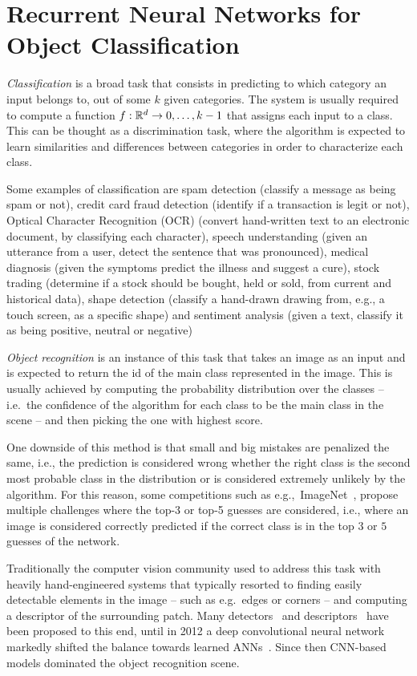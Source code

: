 \chapter{Recurrent Neural Networks for Object Classification}\label{sec:renet}

\emph{Classification} is a broad task that consists in predicting to which
category an input belongs to, out of some $k$ given categories. The system is
usually required to compute a function $f: \mathbb{R}^d \to {0, \dots, k-1}$ that
assigns each input to a class. This can be thought as a discrimination task,
where the algorithm is expected to learn similarities and differences between
categories in order to characterize each class.

Some examples of classification are spam detection (classify a message as being
spam or not), credit card fraud detection (identify if a transaction is legit
or not), Optical Character Recognition (OCR) (convert hand-written text to an
electronic document, by classifying each character), speech understanding
(given an utterance from a user, detect the sentence that was pronounced),
medical diagnosis (given the symptoms predict the illness and suggest a cure),
stock trading (determine if a stock should be bought, held or sold, from
current and historical data), shape detection (classify a hand-drawn drawing
from, e.g., a touch screen, as a specific shape) and sentiment analysis (given
a text, classify it as being positive, neutral or negative)

\emph{Object recognition} is an instance of this task that takes an image as an
input and is expected to return the id of the main class represented in the
image. This is usually achieved by computing the probability distribution over
the classes -- i.e.\ the confidence of the algorithm for each class to be the
main class in the scene -- and then picking the one with highest score.

One downside of this method is that small and big mistakes are penalized the
same, i.e., the prediction is considered wrong whether the right class is the
second most probable class in the distribution or is considered extremely
unlikely by the algorithm. For this reason, some competitions such as
e.g.,~ImageNet~\citep{imagenet_cvpr09, ILSVRCarxiv14}, propose multiple
challenges where the top-3 or top-5 guesses are considered, i.e., where an
image is considered correctly predicted if the correct class is in the top
$3$ or $5$ guesses of the network.

Traditionally the computer vision community used to address this task with
heavily hand-engineered systems that typically resorted to finding easily
detectable elements in the image -- such as e.g.\ edges or corners -- and
computing a descriptor of the surrounding patch. Many detectors~\citep{
dufournaud2000matching,harris1988combined,mikolajczyk2001indexing,
lowe2004distinctive,mikolajczyk2005performance} and descriptors~\citep{
lowe1999object,mikolajczyk2005performance,belongie2002shape} have been proposed
to this end, until in 2012 a deep convolutional neural network markedly shifted
the balance towards learned ANNs~\citep{Krizhevsky-2012}. Since then CNN-based
models dominated the object recognition scene.

